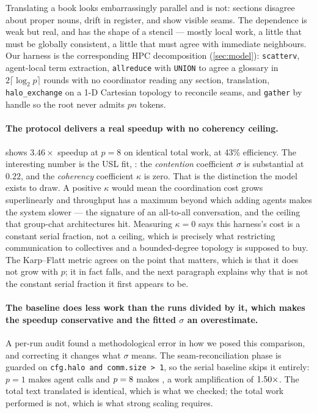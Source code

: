 \documentclass[10pt,twocolumn]{article}
\theoremstyle{definition}
\theoremstyle{plain}
\newcommand{\code}[1]{\texttt{\small #1}}
\begin{document}
Translating a book looks embarrassingly parallel and is not: sections disagree about
proper nouns, drift in register, and show visible seams. The dependence is weak but
real, and has the shape of a stencil --- mostly local work, a little that must be
globally consistent, a little that must agree with immediate neighbours. Our harness
is the corresponding HPC decomposition (\cref{sec:model}): \code{scatterv},
agent-local term extraction, \code{allreduce} with \code{UNION} to agree a glossary
in $2\lceil\log_2 p\rceil$ rounds with no coordinator reading any section,
translation, \code{halo\_exchange} on a 1-D Cartesian topology to reconcile seams,
and \code{gather} by handle so the root never admits $pn$ tokens.

\paragraph{The protocol delivers a real speedup with no coherency ceiling.}
 shows $3.46\times$ speedup at $p=8$ on identical total work,
at 43\% efficiency. The interesting number is the USL fit, \NUslFit: the
\emph{contention} coefficient $\sigma$ is substantial at $0.22$, and the
\emph{coherency} coefficient $\kappa$ is zero. That is the distinction the model
exists to draw. A positive $\kappa$ would mean the coordination cost grows
superlinearly and throughput has a maximum beyond which adding agents makes the
system slower --- the signature of an all-to-all conversation, and the ceiling that
group-chat architectures hit. Measuring $\kappa=0$ says this harness's cost is a
constant serial fraction, not a ceiling, which is precisely what restricting
communication to collectives and a bounded-degree topology is supposed to buy. The
Karp--Flatt metric agrees on the point that matters, which is that it does not grow with
$p$; it in fact falls, and the next paragraph explains why that is not the constant
serial fraction it first appears to be.

\paragraph{The baseline does less work than the runs divided by it, which makes the
speedup conservative and the fitted $\sigma$ an overestimate.} A per-run audit found a
methodological error in how we posed this comparison, and correcting it changes what
$\sigma$ means. The seam-reconciliation phase is guarded on
\code{cfg.halo and comm.size > 1}, so the serial baseline skips it entirely: $p=1$ makes
\NScalingBaseCalls{} agent calls and $p=8$ makes \NScalingTopCalls, a work
amplification of $1.50\times$. The total text translated is identical, which
is what we checked; the total work performed is not, which is what strong scaling
requires.
\end{document}
